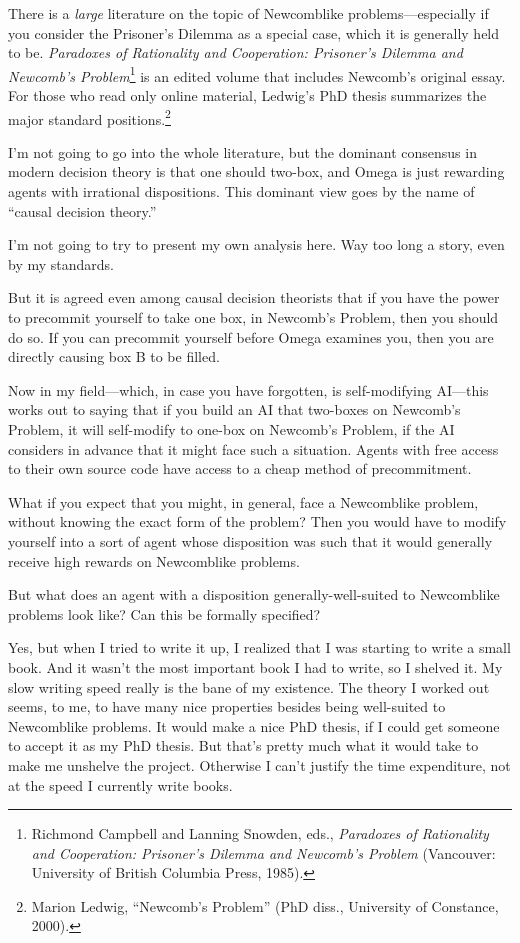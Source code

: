 {
 There is a \textit{large} literature on the topic of Newcomblike
problems---especially if you consider the Prisoner's
Dilemma as a special case, which it is generally held to be.
\textit{Paradoxes of Rationality and Cooperation:
Prisoner's Dilemma and Newcomb's
Problem}\footnote{Richmond Campbell and Lanning Snowden, eds., \textit{Paradoxes
of Rationality and Cooperation: Prisoner's Dilemma and
Newcomb's Problem} (Vancouver: University of British
Columbia Press, 1985).} is an edited volume that includes
Newcomb's original essay. For those who read only
online material, Ledwig's PhD thesis summarizes the
major standard positions.\footnote{Marion Ledwig, ``Newcomb's
Problem'' (PhD diss., University of Constance,
2000).}}

{
 I'm not going to go into the whole literature, but
the dominant consensus in modern decision theory is that one should
two-box, and Omega is just rewarding agents with irrational
dispositions. This dominant view goes by the name of
``causal decision theory.''}

{
 I'm not going to try to present my own analysis
here. Way too long a story, even by my standards.}

{
 But it is agreed even among causal decision theorists that if you
have the power to precommit yourself to take one box, in
Newcomb's Problem, then you should do so. If you can
precommit yourself before Omega examines you, then you are directly
causing box B to be filled.}

{
 Now in my field---which, in case you have forgotten, is
self-modifying AI---this works out to saying that if you build an AI
that two-boxes on Newcomb's Problem, it will
self-modify to one-box on Newcomb's Problem, if the AI
considers in advance that it might face such a situation. Agents with
free access to their own source code have access to a cheap method of
precommitment.}

{
 What if you expect that you might, in general, face a Newcomblike
problem, without knowing the exact form of the problem? Then you would
have to modify yourself into a sort of agent whose disposition was such
that it would generally receive high rewards on Newcomblike problems.}

{
 But what does an agent with a disposition generally-well-suited to
Newcomblike problems look like? Can this be formally specified?}

{
 Yes, but when I tried to write it up, I realized that I was
starting to write a small book. And it wasn't the most
important book I had to write, so I shelved it. My slow writing speed
really is the bane of my existence. The theory I worked out seems, to
me, to have many nice properties besides being well-suited to
Newcomblike problems. It would make a nice PhD thesis, if I could get
someone to accept it as my PhD thesis. But that's
pretty much what it would take to make me unshelve the project.
Otherwise I can't justify the time expenditure, not at
the speed I currently write books.}

